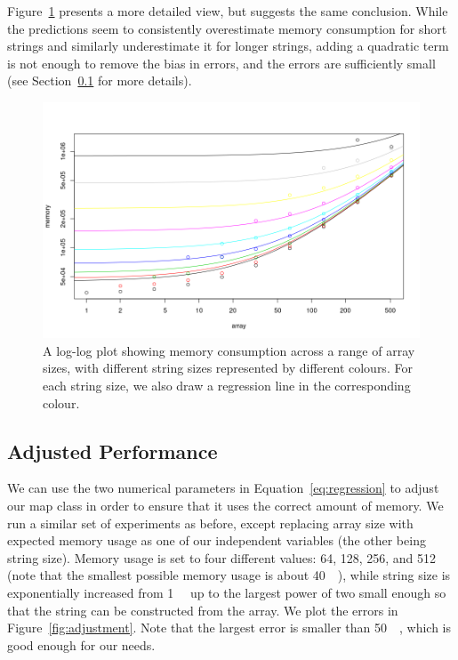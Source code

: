 \documentclass{article}
\begin{document}
Figure~\ref{fig:regression2} presents a more detailed view, but suggests
the same conclusion. While the predictions seem to consistently overestimate
memory consumption for short strings and similarly underestimate it for longer
strings, adding a quadratic term is not enough to remove the bias in errors, and
the errors are sufficiently small (see Section~\ref{sec:after_adjustments} for
more details).

\begin{figure}
  \centering
  \includegraphics[width=\textwidth]{../proof_of_concept/prediction1.png}
  \caption{A log-log plot showing memory consumption across a range of array
    sizes, with different string sizes represented by different colours. For
    each string size, we also draw a regression line in the corresponding
    colour.}
  \label{fig:regression2}
\end{figure}

\subsection{Adjusted Performance} \label{sec:after_adjustments}

We can use the two numerical parameters in Equation~\eqref{eq:regression} to
adjust our map class in order to ensure that it uses the correct amount
of memory. We run a similar set of experiments as before, except replacing array
size with expected memory usage as one of our independent variables (the other
being string size). Memory usage is set to four different values: 64, 128,
256, and \SI{512}{\mebi\byte} (note that the smallest possible memory usage is
about \SI{40}{\mebi\byte}), while string size is exponentially increased from
\SI{1}{\mebi\byte} up to the largest power of two small enough so that the
string can be constructed from the array. We plot the errors in
Figure~\ref{fig:adjustment}. Note that the largest error is smaller than
\SI{50}{\kibi\byte}, which is good enough for our needs.
\end{document}
